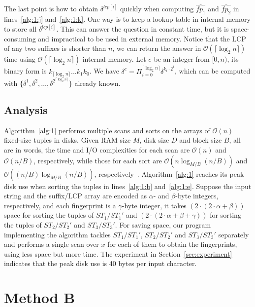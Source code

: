 \documentclass[10pt,journal,compsoc]{IEEEtran}
\begin{document}
The last point is how to obtain $\delta^{lcp[i]}$ quickly when computing $\hat{fp_1}$ and $\hat{fp_2}$ in lines~\ref{alg:1:j} and~\ref{alg:1:k}. One way is to keep a lookup table in internal memory to store all $\delta^{lcp[i]}$. This can answer the question in constant time, but it is space-consuming and impractical to be used in external memory. Notice that the LCP of any two suffixes is shorter than $n$, we can return the answer in $\mathcal{O}(\lceil \log_2{n} \rceil)$ time using $\mathcal{O}(\lceil \log_2{n} \rceil)$ internal memory. Let $e$ be an integer from $[0, n)$, its binary form is $k_{\lceil \log_2{n} \rceil}...k_1k_0$. We have $\delta^e = \Pi_{i = 0}^{\lceil \log_2{n} \rceil}{\delta}^{k_i \cdot 2^i}$, which can be computed with $\{{\delta}^{1}, {\delta}^{2}, \dots, {\delta}^{2^{\lceil \log_2{n} \rceil}} \}$ already known.

\subsection{Analysis} \label{sec:method1:analysis}


Algorithm~\ref{alg:1} performs multiple scans and sorts on the arrays of $\mathcal{O}(n)$ fixed-size tuples in disks. Given RAM size $M$, disk size $D$ and block size $B$, all are in words, the time and I/O complexities for each scan are $\mathcal{O}(n)$ and $\mathcal{O}(n / B)$, respectively, while those for each sort are $\mathcal{O}(n\log_{M/ B}(n / B))$ and $\mathcal{O}((n / B)\log_{M / B}(n / B))$, respectively~\cite{Arge2013}. Algorithm~\ref{alg:1} reaches its peak disk use when sorting the tuples in lines~\ref{alg:1:b} and~\ref{alg:1:e}. Suppose the input string and the suffix/LCP array are encoded as $\alpha$- and $\beta$-byte integers, respectively, and each fingerprint is a $\gamma$-byte integer, it takes $(2 \cdot (2 \cdot \alpha + \beta))$ space for sorting the tuples of $ST_1/ST_1'$ and $(2 \cdot (2 \cdot \alpha + \beta + \gamma))$ for sorting the tuples of $ST_2/ST_2'$ and $ST_3/ST_3'$. For saving space, our program implementing the algorithm tackles $ST_1/ST_1'$, $ST_2/ST_2'$ and $ST_3/ST_3'$ separately and performs a single scan over $x$ for each of them to obtain the fingerprints, using less space but more time. The experiment in Section~\ref{sec:experiment} indicates that the peak disk use is 40 bytes per input character. 

\section{Method B} \label{sec:method2}
\end{document}
